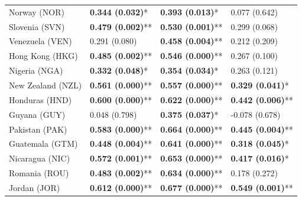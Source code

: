 \begin{longtable}{p{5cm}p{3cm}p{3cm}p{5cm}}
Norway (NOR) & \textcolor{atlLime600}{\textbf{0.344 (0.032)}*} & \textcolor{atlLime600}{\textbf{0.393 (0.013)}*} & \textcolor{atlOrange600}{0.077 (0.642)} \\
Slovenia (SVN) & \textcolor{atlLime600}{\textbf{0.479 (0.002)}**} & \textcolor{atlLime600}{\textbf{0.530 (0.001)}**} & \textcolor{atlOrange600}{0.299 (0.068)} \\
Venezuela (VEN) & \textcolor{atlOrange600}{0.291 (0.080)} & \textcolor{atlLime600}{\textbf{0.458 (0.004)}**} & \textcolor{atlOrange600}{0.212 (0.209)} \\
Hong Kong (HKG) & \textcolor{atlLime600}{\textbf{0.485 (0.002)}**} & \textcolor{atlLime600}{\textbf{0.546 (0.000)}**} & \textcolor{atlOrange600}{0.267 (0.100)} \\
Nigeria (NGA) & \textcolor{atlLime600}{\textbf{0.332 (0.048)}*} & \textcolor{atlLime600}{\textbf{0.354 (0.034)}*} & \textcolor{atlOrange600}{0.263 (0.121)} \\
New Zealand (NZL) & \textcolor{atlLime600}{\textbf{0.561 (0.000)}**} & \textcolor{atlLime600}{\textbf{0.557 (0.000)}**} & \textcolor{atlLime600}{\textbf{0.329 (0.041)}*} \\
Honduras (HND) & \textcolor{atlLime600}{\textbf{0.600 (0.000)}**} & \textcolor{atlLime600}{\textbf{0.622 (0.000)}**} & \textcolor{atlLime600}{\textbf{0.442 (0.006)}**} \\
Guyana (GUY) & \textcolor{atlOrange600}{0.048 (0.798)} & \textcolor{atlLime600}{\textbf{0.375 (0.037)}*} & \textcolor{atlOrange600}{-0.078 (0.678)} \\
Pakistan (PAK) & \textcolor{atlLime600}{\textbf{0.583 (0.000)}**} & \textcolor{atlLime600}{\textbf{0.664 (0.000)}**} & \textcolor{atlLime600}{\textbf{0.445 (0.004)}**} \\
Guatemala (GTM) & \textcolor{atlLime600}{\textbf{0.448 (0.004)}**} & \textcolor{atlLime600}{\textbf{0.641 (0.000)}**} & \textcolor{atlLime600}{\textbf{0.318 (0.045)}*} \\
Nicaragua (NIC) & \textcolor{atlLime600}{\textbf{0.572 (0.001)}**} & \textcolor{atlLime600}{\textbf{0.653 (0.000)}**} & \textcolor{atlLime600}{\textbf{0.417 (0.016)}*} \\
Romania (ROU) & \textcolor{atlLime600}{\textbf{0.483 (0.002)}**} & \textcolor{atlLime600}{\textbf{0.634 (0.000)}**} & \textcolor{atlOrange600}{0.178 (0.272)} \\
Jordan (JOR) & \textcolor{atlLime600}{\textbf{0.612 (0.000)}**} & \textcolor{atlLime600}{\textbf{0.677 (0.000)}**} & \textcolor{atlLime600}{\textbf{0.549 (0.001)}**} \\

\end{longtable}
